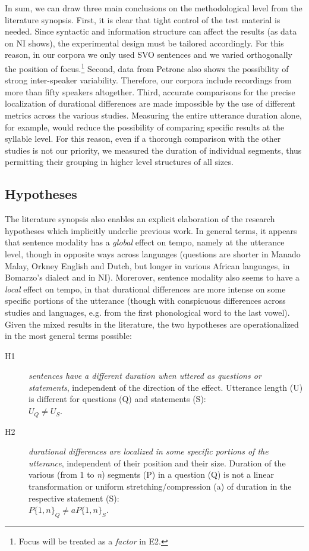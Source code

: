 In sum, we can draw three main conclusions on the methodological level from the literature synopsis. First, it is clear that tight control of the test material is needed. Since syntactic and information structure can affect the results (as data on NI shows), the experimental design must be tailored accordingly. For this reason, in our corpora we only used SVO sentences and we varied orthogonally the position of focus.\footnote{Focus will be treated as a \textit{factor} in E2.} Second, data from Petrone also shows the possibility of strong inter-speaker variability. Therefore, our corpora include recordings from more than fifty speakers altogether. Third, accurate comparisons for the precise localization of durational differences are made impossible by the use of different metrics across the various studies. Measuring the entire utterance duration alone, for example, would reduce the possibility of comparing specific results at the syllable level. For this reason, even if a thorough comparison with the other studies is not our priority, we measured the duration of individual segments, thus permitting their grouping in higher level structures of all sizes.

\subsection{Hypotheses}\label{sec431}
The literature synopsis also enables an explicit elaboration of the research hypotheses which implicitly underlie previous work. In general terms, it appears that sentence modality has a \textit{global} effect on tempo, namely at the utterance level, though in opposite ways across languages (questions are shorter in Manado Malay, Orkney English and Dutch, but longer in various African languages, in Bomarzo's dialect and in NI). Morerover, sentence modality also seems to have a \textit{local} effect on tempo, in that durational differences are more intense on some specific portions of the utterance (though with conspicuous differences across studies and languages, e.g. from the first phonological word to the last vowel). Given the mixed results in the literature, the two hypotheses are operationalized in the most general terms possible: 

\begin{description}
   \item[H1] \textit{sentences have a different duration when uttered as questions or statements}, independent of the direction of the  effect. Utterance length (U) is different for questions (Q) and statements (S):\\ $U_{Q} \neq U_{S}$.
   \item[H2] \textit{durational differences are localized in some specific portions of the utterance}, independent of their position and their size. Duration of the various (from 1 to \textit{n}) segments (P) in a question (Q) is not a linear transformation or uniform stretching/compression (a) of duration in the respective statement (S):\\ $P\{1,n\}_{Q} \neq aP\{1,n\}_{S}$.
\end{description}

